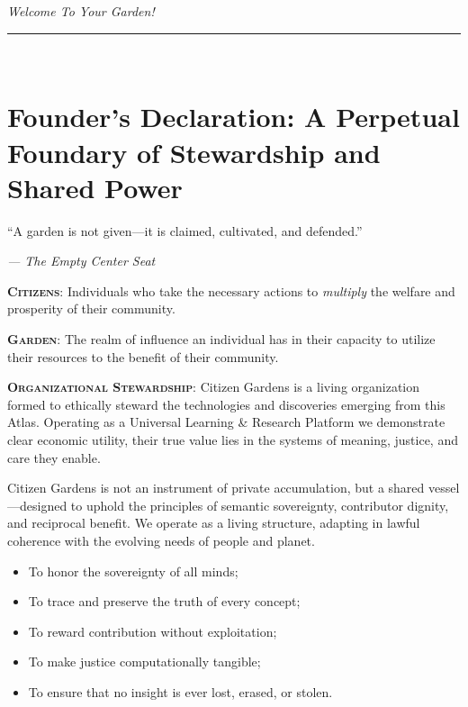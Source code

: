 \documentclass[12pt]{article}
\begin{document}
\clearpage
\thispagestyle{empty}
\begin{center}
    {\Huge \textit{Welcome To Your Garden!}}\\[1em]
    \rule{0.6\textwidth}{0.4pt} \\[1em]

    \section*{Founder's Declaration: A Perpetual Foundary of Stewardship and Shared Power}
\end{center}

\vspace{2em}
\epigraph{“A garden is not given—it is claimed, cultivated, and defended.”}{\textit{— The Empty Center Seat}}
\vspace{1em}

\textbf{\textsc{Citizens}}: Individuals who take the necessary actions to \textit{multiply} the welfare and prosperity of their community.

\vspace{1em}
\textbf{\textsc{Garden}}: The realm of influence an individual has in their capacity to utilize their resources to the benefit of their community.

\vspace{1em}
\textbf{\textsc{Organizational Stewardship}}: Citizen Gardens is a living organization formed to ethically steward the technologies and discoveries emerging from this Atlas. Operating as a Universal Learning \& Research Platform we demonstrate clear economic utility, their true value lies in the systems of meaning, justice, and care they enable.

Citizen Gardens is not an instrument of private accumulation, but a shared vessel—designed to uphold the principles of semantic sovereignty, contributor dignity, and reciprocal benefit. We operate as a living structure, adapting in lawful coherence with the evolving needs of people and planet.


\begin{itemize}
    \item To honor the sovereignty of all minds;
    \item To trace and preserve the truth of every concept;
    \item To reward contribution without exploitation;
    \item To make justice computationally tangible;
    \item To ensure that no insight is ever lost, erased, or stolen.
\end{itemize}
\end{document}
